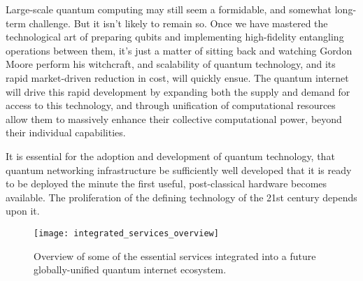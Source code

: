 Large-scale quantum computing may still seem a formidable, and somewhat long-term challenge. But it isn't likely to remain so. Once we have mastered the technological art of preparing qubits and implementing high-fidelity entangling operations between them, it's just a matter of sitting back and watching Gordon Moore perform his witchcraft, and scalability of quantum technology, and its rapid market-driven reduction in cost, will quickly ensue. The quantum internet will drive this rapid development by expanding both the supply and demand for access to this technology, and through unification of computational resources allow them to massively enhance their collective computational power, beyond their individual capabilities.

It is essential for the adoption and development of quantum technology, that quantum networking infrastructure be sufficiently well developed that it is ready to be deployed the minute the first useful, post-classical hardware becomes available. The proliferation of the defining technology of the 21st century depends upon it.

\begin{figure*}[!htbp]
	\texttt{[image: integrated\_services\_overview]}
	\captionspacefig \caption{Overview of some of the essential services integrated into a future globally-unified quantum internet ecosystem.}\label{fig:integrated_services_overview}
\end{figure*}